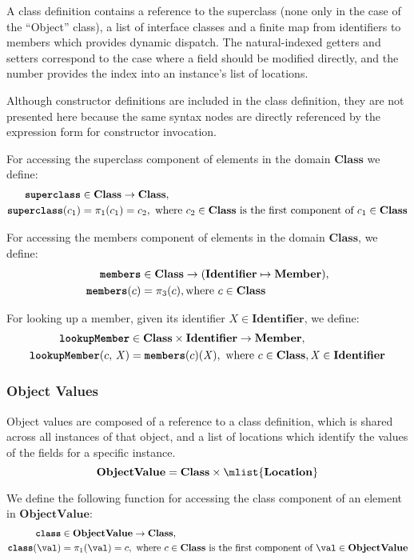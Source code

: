 \documentclass[a4paper,oneside,fleqn]{article}
\newcommand{\synt}[1]{\ensuremath{\text{\textbf{\texttt{#1}}}}}
\DeclareMathOperator{\superclass}{\synt{superclass}}
\DeclareMathOperator{\members}{\synt{members}}
\DeclareMathOperator{\lookupMember}{\synt{lookupMember}}
\DeclareMathOperator{\class}{\synt{class}}
\newcommand{\dobjval}{\mathbf{ObjectValue}}
\newcommand{\dmember}{\mathbf{Member}}
\newcommand{\dident}{\mathbf{Identifier}}
\newcommand{\idmeta}{\ensuremath{\mathit{X}}}
\newcommand{\dclass}{\mathbf{Class}}
\begin{document}
A class definition contains a reference to the superclass (none only in the case of the ``Object'' class), a list of interface classes and a finite map from identifiers to members which provides dynamic dispatch.
The natural-indexed getters and setters correspond to the case where a field should be modified directly, and the number provides the index into an instance's list of locations.

Although constructor definitions are included in the class definition, they are not presented here because the same syntax nodes are directly referenced by the expression form for constructor invocation.

For accessing the superclass component of elements in the domain $\dclass$ we define:
\begin{align*}
\superclass &\in \dclass \rightarrow \dclass,\\
\superclass(c_1) &= \pi_1(c_1) = c_2, \text{ where $c_2 \in \dclass$ is the first component of $c_1 \in \dclass$}
\end{align*}

For accessing the members component of elements in the domain $\dclass$, we define:
\begin{align*}
\members &\in \dclass \rightarrow (\dident \mapsto \dmember),\\
\members(c) &= \pi_3(c), \text{where $c \in \dclass$}
\end{align*}

For looking up a member, given its identifier $\idmeta \in \dident$, we define:
\begin{align*}
\lookupMember &\in \dclass \times \dident \rightarrow \dmember,\\
\lookupMember(c, \, \idmeta) &= \members(c)(\idmeta), \text{ where $c \in \dclass, \idmeta \in \dident$}
\end{align*}

\subsubsection{Object Values}
\label{subsec:object-values}

Object values are composed of a reference to a class definition, which is shared across all instances of that object, and a list of locations which identify the values of the fields for a specific instance.
\[
    \dobjval = \dclass \times \mlist{\dlocation}
\]

We define the following function for accessing the class component of an element in $\dobjval$:
\begin{align*}
\class &\in \dobjval \rightarrow \dclass,\\
\class(\val) &= \pi_1(\val) = c, \text{ where $c \in \dclass$ is the first component of $\val \in \dobjval$}
\end{align*}
\end{document}
